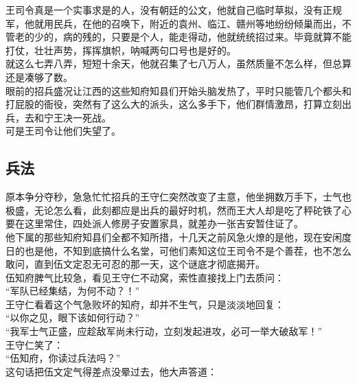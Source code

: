 \begin{multicols}{\theparacolNo}
王司令真是一个实事求是的人，没有朝廷的公文，他就自己临时草拟，没有正规军，他就用民兵，在他的召唤下，附近的袁州、临江、赣州等地纷纷倾巢而出，不管老的少的，病的残的，只要是个人，能走得动，他就统统招过来。毕竟就算不能打仗，壮壮声势，挥挥旗帜，呐喊两句口号也是好的。\\

就这么七弄八弄，短短十余天，他就召集了七八万人，虽然质量不怎么样，但总算还是凑够了数。\\

眼前的招兵盛况让江西的这些知府知县们开始头脑发热了，平时只能管几个都头和打屁股的衙役，突然有了这么大的派头，这么多手下，他们群情激昂，打算立刻出兵，去和宁王决一死战。\\

可是王司令让他们失望了。\\

\subsection{兵法}
原本争分夺秒，急急忙忙招兵的王守仁突然改变了主意，他坐拥数万手下，士气也极盛，无论怎么看，此刻都应是出兵的最好时机，然而王大人却是吃了秤砣铁了心要在这里常住，四处派人修房子安置家具，就差办一张吉安暂住证了。\\

他下属的那些知府知县们全都不知所措，十几天之前风急火燎的是他，现在安闲度日的也是他，不知到底搞什么名堂，可他们素知这位王司令不是个善茬，也不怎么敢问，直到伍文定忍无可忍的那一天，这个谜底才彻底揭开。\\

伍知府脾气比较急，看见王守仁不动窝，索性直接找上门去质问：\\

“军队已经集结，为何不动？！”\\

王守仁看着这个气急败坏的知府，却并不生气，只是淡淡地回复：\\

“以你之见，眼下该如何行动？”\\

“我军士气正盛，应趁敌军尚未行动，立刻发起进攻，必可一举大破敌军！”\\

王守仁笑了：\\

“伍知府，你读过兵法吗？”\\

这句话把伍文定气得差点没晕过去，他大声答道：\\


\end{multicols}
